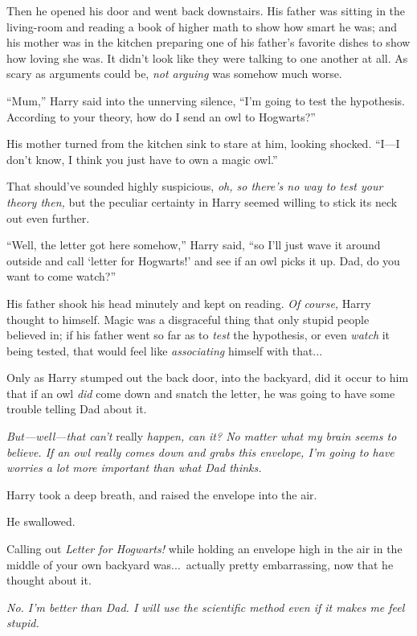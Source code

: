 Then he opened his door and went back downstairs. His father was sitting in the living-room and reading a book of higher math to show how smart he was; and his mother was in the kitchen preparing one of his father’s favorite dishes to show how loving she was. It didn’t look like they were talking to one another at all. As scary as arguments could be, \emph{not arguing} was somehow much worse.

“Mum,” Harry said into the unnerving silence, “I’m going to test the hypothesis. According to your theory, how do I send an owl to Hogwarts?”

His mother turned from the kitchen sink to stare at him, looking shocked. “I—I don’t know, I think you just have to own a magic owl.”

That should’ve sounded highly suspicious, \emph{oh, so there’s no way to test your theory then,} but the peculiar certainty in Harry seemed willing to stick its neck out even further.

“Well, the letter got here somehow,” Harry said, “so I’ll just wave it around outside and call ‘letter for Hogwarts!’ and see if an owl picks it up. Dad, do you want to come watch?”

His father shook his head minutely and kept on reading. \emph{Of course,} Harry thought to himself. Magic was a disgraceful thing that only stupid people believed in; if his father went so far as to \emph{test} the hypothesis, or even \emph{watch} it being tested, that would feel like \emph{associating} himself with that...

Only as Harry stumped out the back door, into the backyard, did it occur to him that if an owl \emph{did} come down and snatch the letter, he was going to have some trouble telling Dad about it.

\emph{But—well—that can’t} really \emph{happen, can it? No matter what my brain seems to believe. If an owl really comes down and grabs this envelope, I’m going to have worries a lot more important than what Dad thinks.}

Harry took a deep breath, and raised the envelope into the air.

He swallowed.

Calling out \emph{Letter for Hogwarts!} while holding an envelope high in the air in the middle of your own backyard was...\ actually pretty embarrassing, now that he thought about it.

\emph{No. I’m better than Dad. I will use the scientific method even if it makes me feel stupid.}

